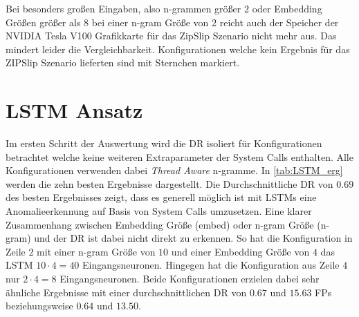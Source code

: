     Bei besonders großen Eingaben, also n-grammen größer $2$ oder Embedding Größen größer als $8$ bei einer n-gram Größe von $2$ reicht auch der Speicher der NVIDIA Tesla V100 Grafikkarte für das ZipSlip Szenario nicht mehr aus.
    Das mindert leider die Vergleichbarkeit.
    Konfigurationen welche kein Ergebnis für das ZIPSlip Szenario lieferten sind mit Sternchen markiert.

\section{LSTM Ansatz}\label{sec:erg_LSTM}
    Im ersten Schritt der Auswertung wird die \ac{DR} isoliert für Konfigurationen betrachtet welche keine weiteren Extraparameter der System Calls enthalten.
    Alle Konfigurationen verwenden dabei \textit{Thread Aware} n-gramme.
    In \autoref{tab:LSTM_erg} werden die zehn besten Ergebnisse dargestellt.
    Die Durchschnittliche \ac{DR} von $0.69$ des besten Ergebnisses zeigt, dass es generell möglich ist mit \acp{LSTM} eine Anomalieerkennung auf Basis von System Calls umzusetzen.
    Eine klarer Zusammenhang zwischen Embedding Größe (embed) oder n-gram Größe (n-gram) und der \ac{DR} ist dabei nicht direkt zu erkennen.
    So hat die Konfiguration in Zeile $2$ mit einer n-gram Größe von $10$ und einer Embedding Größe von $4$ das \ac{LSTM} $10 \cdot 4=40$ Eingangsneuronen.
    Hingegen hat die Konfiguration aus Zeile $4$ nur $2 \cdot 4 = 8$ Eingangsneuronen.
    Beide Konfigurationen erzielen dabei sehr ähnliche Ergebnisse mit einer durchschnittlichen \ac{DR} von $0.67$ und $15.63$ \acp{FP} beziehungsweise $0.64$ und $13.50$.


